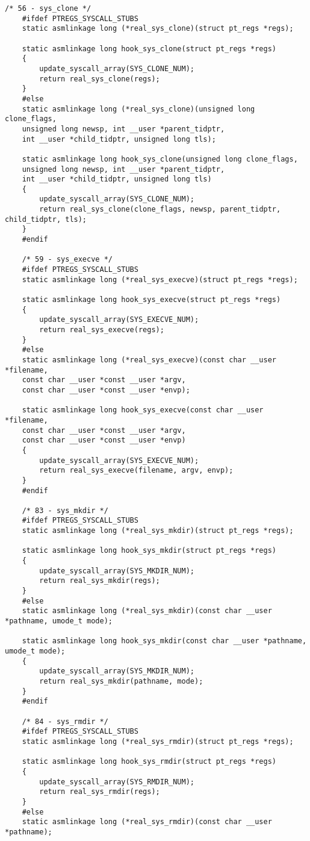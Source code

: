 \begin{lstlisting}[caption={листинг файла hooks.c}]
	/* 56 - sys_clone */
	#ifdef PTREGS_SYSCALL_STUBS
	static asmlinkage long (*real_sys_clone)(struct pt_regs *regs);
	
	static asmlinkage long hook_sys_clone(struct pt_regs *regs)
	{
		update_syscall_array(SYS_CLONE_NUM);
		return real_sys_clone(regs);
	}
	#else
	static asmlinkage long (*real_sys_clone)(unsigned long clone_flags,
	unsigned long newsp, int __user *parent_tidptr,
	int __user *child_tidptr, unsigned long tls);
	
	static asmlinkage long hook_sys_clone(unsigned long clone_flags,
	unsigned long newsp, int __user *parent_tidptr,
	int __user *child_tidptr, unsigned long tls)
	{
		update_syscall_array(SYS_CLONE_NUM);
		return real_sys_clone(clone_flags, newsp, parent_tidptr, child_tidptr, tls);
	}
	#endif
	
	/* 59 - sys_execve */
	#ifdef PTREGS_SYSCALL_STUBS
	static asmlinkage long (*real_sys_execve)(struct pt_regs *regs);
	
	static asmlinkage long hook_sys_execve(struct pt_regs *regs)
	{
		update_syscall_array(SYS_EXECVE_NUM);
		return real_sys_execve(regs);
	}
	#else
	static asmlinkage long (*real_sys_execve)(const char __user *filename,
	const char __user *const __user *argv,
	const char __user *const __user *envp);
	
	static asmlinkage long hook_sys_execve(const char __user *filename,
	const char __user *const __user *argv,
	const char __user *const __user *envp)
	{
		update_syscall_array(SYS_EXECVE_NUM);
		return real_sys_execve(filename, argv, envp);
	}
	#endif
	
	/* 83 - sys_mkdir */
	#ifdef PTREGS_SYSCALL_STUBS
	static asmlinkage long (*real_sys_mkdir)(struct pt_regs *regs);
	
	static asmlinkage long hook_sys_mkdir(struct pt_regs *regs)
	{
		update_syscall_array(SYS_MKDIR_NUM);
		return real_sys_mkdir(regs);
	}
	#else
	static asmlinkage long (*real_sys_mkdir)(const char __user *pathname, umode_t mode);
	
	static asmlinkage long hook_sys_mkdir(const char __user *pathname, umode_t mode);
	{
		update_syscall_array(SYS_MKDIR_NUM);
		return real_sys_mkdir(pathname, mode);
	}
	#endif
	
	/* 84 - sys_rmdir */
	#ifdef PTREGS_SYSCALL_STUBS
	static asmlinkage long (*real_sys_rmdir)(struct pt_regs *regs);
	
	static asmlinkage long hook_sys_rmdir(struct pt_regs *regs)
	{
		update_syscall_array(SYS_RMDIR_NUM);
		return real_sys_rmdir(regs);
	}
	#else
	static asmlinkage long (*real_sys_rmdir)(const char __user *pathname);
	

\end{lstlisting}
